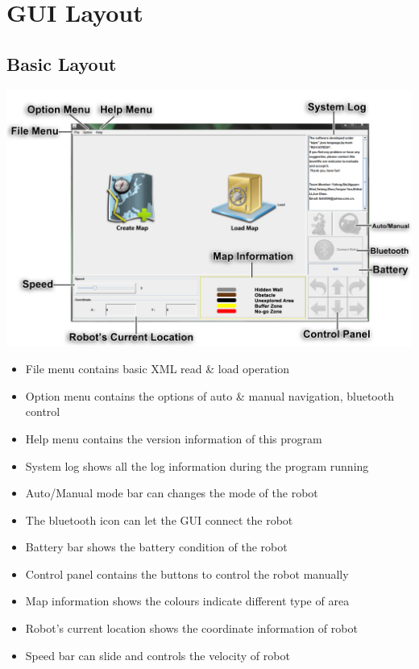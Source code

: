 \documentclass[11pt, a4paper]{report}
\begin{document}



\chapter{GUI Layout} %
\label{cha:gui_layout}

\section{Basic Layout} %
\label{sec:basic_layout}
\begin{center}
\includegraphics[scale=0.388]{./image/GUIOverview.png}
\end{center}

\begin{itemize}
	\item File menu contains basic XML read \& load operation
	\item Option menu contains the options of auto \& manual navigation, bluetooth control
	\item Help menu contains the version information of this program
	\item System log shows all the log information during the program running
	\item Auto/Manual mode bar can changes the mode of the robot
	\item The bluetooth icon can let the GUI connect the robot
	\item Battery bar shows the battery condition of the robot
	\item Control panel contains the buttons to control the robot manually
	\item Map information shows the colours indicate different type of area
	\item Robot's current location shows the coordinate information of robot
	\item Speed bar can slide and controls the velocity of robot
\end{itemize}
\end{document}
